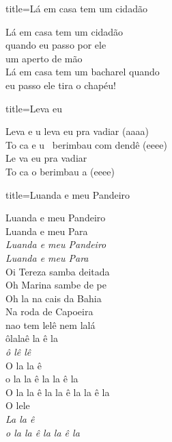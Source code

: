 \documentclass[fontsize=14pt, paper=a4, twoside, DIV=20]{scrreprt} %
\begin{document}
\begin{multicols*}{2}
\begin{song}{title={Lá em casa tem um cidadão}}
        \begin{verse*}
            Lá em casa tem um cidadão\\
            quando eu passo por ele \\
            um aperto de mão\\
            Lá em casa tem um bacharel quando\\
            eu passo ele tira o chapéu!\\
        \end{verse*}
\end{song}
\begin{song}{title={Leva eu}}
        \begin{verse*}
            Leva e u leva eu pra vadiar (aaaa)\\
            To ca e u \ berimbau com dendê (eeee)\\
            Le va eu pra vadiar\\
            To ca o berimbau a (eeee)\\
        \end{verse*}
\end{song}

\begin{song}{title={Luanda e meu Pandeiro}}
        \begin{verse*}
            Luanda e meu Pandeiro\\
            Luanda e meu Para\\
            \textit{Luanda e meu Pandeiro}\\
            \textit{Luanda e meu Para}\\
            Oi Tereza samba deitada\\
            Oh Marina sambe de pe\\
            Oh la na cais da Bahia\\
            Na roda de Capoeira\\
            nao tem lelê nem lalá\\
            ôlalaê la ê la\\
            \textit{ô lê lê}\\
            O la la ê\\
            o la la ê la la ê la\\
            O la la ê la la ê la la ê la\\
            O lele\\
            \textit{La la ê}\\
            \textit{o la la ê la la ê la}\\
        \end{verse*}
\end{song}


\end{multicols*}
\end{document}
